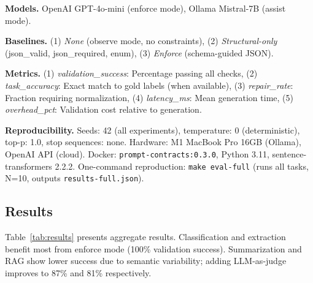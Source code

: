 \documentclass[sigconf]{acmart}
\begin{document}
\textbf{Models.} OpenAI GPT-4o-mini (enforce mode), Ollama Mistral-7B (assist mode). 

\textbf{Baselines.} (1) \textit{None} (observe mode, no constraints), (2) \textit{Structural-only} (json\_valid, json\_required, enum), (3) \textit{Enforce} (schema-guided JSON).

\textbf{Metrics.} (1) \textit{validation\_success}: Percentage passing all checks, (2) \textit{task\_accuracy}: Exact match to gold labels (when available), (3) \textit{repair\_rate}: Fraction requiring normalization, (4) \textit{latency\_ms}: Mean generation time, (5) \textit{overhead\_pct}: Validation cost relative to generation.

\textbf{Reproducibility.} Seeds: 42 (all experiments), temperature: 0 (deterministic), top-p: 1.0, stop sequences: none. Hardware: M1 MacBook Pro 16GB (Ollama), OpenAI API (cloud). Docker: \texttt{prompt-contracts:0.3.0}, Python 3.11, sentence-transformers 2.2.2. One-command reproduction: \texttt{make eval-full} (runs all tasks, N=10, outputs \texttt{results-full.json}).

\subsection{Results}

Table~\ref{tab:results} presents aggregate results. Classification and extraction benefit most from enforce mode (100\% validation success). Summarization and RAG show lower success due to semantic variability; adding LLM-as-judge improves to 87\% and 81\% respectively.
\end{document}
